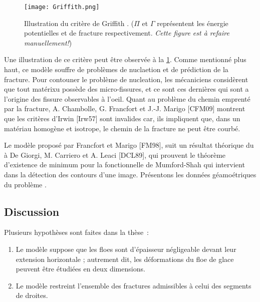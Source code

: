 \begin{figure}[!ht]
    \centering
    \texttt{[image: Griffith.png]}
    \caption{Illustration du critère de Griffith \parencite{gross2017fracture}. ($\Pi$ et $\Gamma$ représentent les énergie potentielles et de fracture respectivement. \textit{Cette figure est à refaire manuellement!})}
    \label{fig:Griffith}
\end{figure}
Une illustration de ce critère peut être observée à la \cref{fig:Griffith}. Comme mentionné plus haut, ce modèle souffre de problèmes de nuclaetion et de prédiction de la fracture. Pour contouner le problème de nucleation, les mécaniciens considèrent que tout matérixu possède des micro-fissures, et ce sont ces dernières qui sont a l'origine des fissure observables à l'oeil. Quant au problème du chemin emprenté par la fracture, A. Chambolle, G. Francfort et J.-J. Marigo [CFM09] montrent que les critères d'Irwin [Irw57] sont invalides car, ils impliquent que, dans un matériau homogène et isotrope, le chemin de la fracture ne peut être courbé.

Le modèle proposé par Francfort et Marigo [FM98], suit un résultat théorique du à De Giorgi, M. Carriero et A. Leaci [DCL89], qui prouvent le théorème d’existence de minimum pour la fonctionnelle de Mumford-Shah qui intervient dans la détection des contours d’une image. Présentons les données géamoétriques du problème \parencite[p.35]{balasoiu2020thesis}.


















\subsection{Discussion}

Plusieurs hypothèses sont faites dans la thèse :
\begin{enumerate}
    \item Le modèle suppose que les floes sont d’épaisseur négligeable devant leur extension horizontale ; autrement dit, les déformations du floe de glace peuvent être étudiées en deux dimensions.
    \item Le modèle restreint l’ensemble des fractures admissibles à celui des segments de droites.
\end{enumerate}